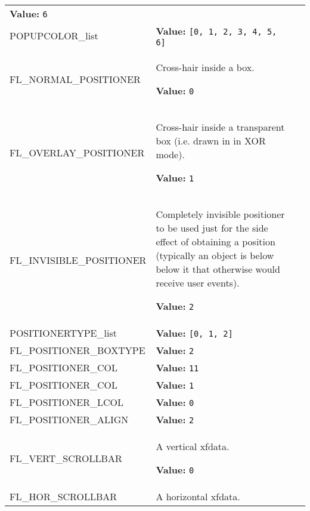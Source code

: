 \begin{longtable}{|p{\varnamewidth}|p{\vardescrwidth}|l}
\textbf{Value:} 
{\tt 6}&\\
\cline{1-2}
\raggedright P\-O\-P\-U\-P\-C\-O\-L\-O\-R\-\_\-l\-i\-s\-t\- & \raggedright \textbf{Value:} 
{\tt \texttt{[}0\texttt{, }1\texttt{, }2\texttt{, }3\texttt{, }4\texttt{, }5\texttt{, }6\texttt{]}}&\\
\cline{1-2}
\raggedright F\-L\-\_\-N\-O\-R\-M\-A\-L\-\_\-P\-O\-S\-I\-T\-I\-O\-N\-E\-R\- & \raggedright Cross-hair inside a box.

\textbf{Value:} 
{\tt 0}&\\
\cline{1-2}
\raggedright F\-L\-\_\-O\-V\-E\-R\-L\-A\-Y\-\_\-P\-O\-S\-I\-T\-I\-O\-N\-E\-R\- & \raggedright Cross-hair inside a transparent box (i.e. drawn in in XOR mode).

\textbf{Value:} 
{\tt 1}&\\
\cline{1-2}
\raggedright F\-L\-\_\-I\-N\-V\-I\-S\-I\-B\-L\-E\-\_\-P\-O\-S\-I\-T\-I\-O\-N\-E\-R\- & \raggedright Completely invisible positioner to be used just for the side effect of
obtaining a position (typically an object is below below it that otherwise
would receive user events).

\textbf{Value:} 
{\tt 2}&\\
\cline{1-2}
\raggedright P\-O\-S\-I\-T\-I\-O\-N\-E\-R\-T\-Y\-P\-E\-\_\-l\-i\-s\-t\- & \raggedright \textbf{Value:} 
{\tt \texttt{[}0\texttt{, }1\texttt{, }2\texttt{]}}&\\
\cline{1-2}
\raggedright F\-L\-\_\-P\-O\-S\-I\-T\-I\-O\-N\-E\-R\-\_\-B\-O\-X\-T\-Y\-P\-E\- & \raggedright \textbf{Value:} 
{\tt 2}&\\
\cline{1-2}
\raggedright F\-L\-\_\-P\-O\-S\-I\-T\-I\-O\-N\-E\-R\-\_\-C\-O\-L\-1\- & \raggedright \textbf{Value:} 
{\tt 11}&\\
\cline{1-2}
\raggedright F\-L\-\_\-P\-O\-S\-I\-T\-I\-O\-N\-E\-R\-\_\-C\-O\-L\-2\- & \raggedright \textbf{Value:} 
{\tt 1}&\\
\cline{1-2}
\raggedright F\-L\-\_\-P\-O\-S\-I\-T\-I\-O\-N\-E\-R\-\_\-L\-C\-O\-L\- & \raggedright \textbf{Value:} 
{\tt 0}&\\
\cline{1-2}
\raggedright F\-L\-\_\-P\-O\-S\-I\-T\-I\-O\-N\-E\-R\-\_\-A\-L\-I\-G\-N\- & \raggedright \textbf{Value:} 
{\tt 2}&\\
\cline{1-2}
\raggedright F\-L\-\_\-V\-E\-R\-T\-\_\-S\-C\-R\-O\-L\-L\-B\-A\-R\- & \raggedright A vertical xfdata.

\textbf{Value:} 
{\tt 0}&\\
\cline{1-2}
\raggedright F\-L\-\_\-H\-O\-R\-\_\-S\-C\-R\-O\-L\-L\-B\-A\-R\- & \raggedright A horizontal xfdata.


\end{longtable}

